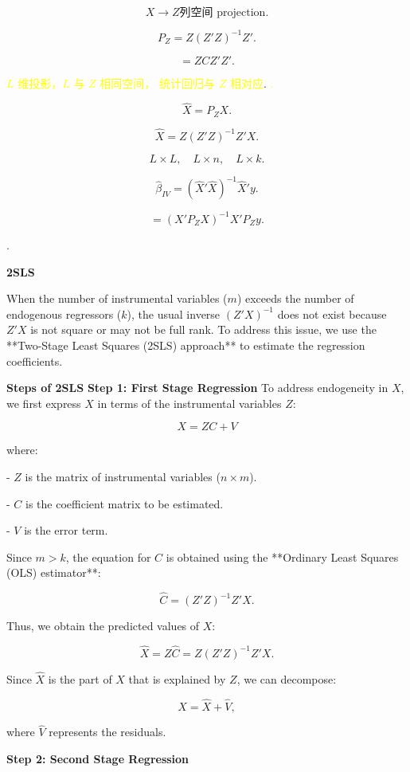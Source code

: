 \documentclass[12pt, oneside]{article}
\begin{document}
\[
X \to Z \text{列空间 projection}.
\]

\[
P_Z = Z (Z'Z)^{-1} Z'.
\]

\[
= Z C Z' Z'.
\]

\textcolor{yellow}{\( L \) 维投影，\( L \) 与 \( Z \) 相同空间， 统计回归与 \( Z \) 相对应}.
\textcolor{yellow}{.}

\[
\hat{X} = P_Z X.
\]

\[
\hat{X} = Z (Z'Z)^{-1} Z' X.
\]

\[
L \times L, \quad L \times n, \quad L \times k.
\]

\[
\hat{\beta}_{IV} = (\hat{X}' \hat{X})^{-1} \hat{X}' y.
\]

\[
= (X' P_Z X)^{-1} X' P_Z y.
\]

\textcolor{blue}{}.

\textbf{2SLS}

When the number of instrumental variables (\( m \)) exceeds the number of endogenous regressors (\( k \)), the usual inverse \( (Z'X)^{-1} \) does not exist because \( Z'X \) is not square or may not be full rank. To address this issue, we use the **Two-Stage Least Squares (2SLS) approach** to estimate the regression coefficients.

\textbf{Steps of 2SLS}
\textbf*{Step 1: First Stage Regression}
To address endogeneity in \( X \), we first express \( X \) in terms of the instrumental variables \( Z \):

\[
X = ZC + V
\]

where:

- \( Z \) is the matrix of instrumental variables (\( n \times m \)).

- \( C \) is the coefficient matrix to be estimated.

- \( V \) is the error term.

Since \( m > k \), the equation for \( C \) is obtained using the **Ordinary Least Squares (OLS) estimator**:

\[
\hat{C} = (Z'Z)^{-1} Z'X.
\]

Thus, we obtain the predicted values of \( X \):

\[
\hat{X} = Z\hat{C} = Z (Z'Z)^{-1} Z' X.
\]

Since \( \hat{X} \) is the part of \( X \) that is explained by \( Z \), we can decompose:

\[
X = \hat{X} + \hat{V},
\]

where \( \hat{V} \) represents the residuals.

\textbf{Step 2: Second Stage Regression}
\end{document}

